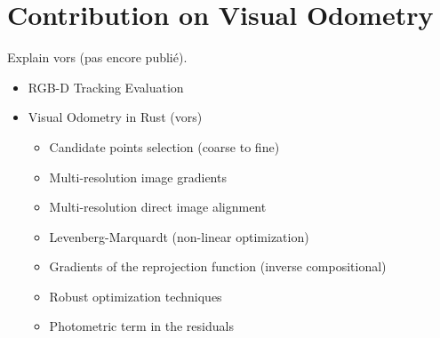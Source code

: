 \chapter{Contribution on Visual Odometry}%
\label{cha:vors}

Explain vors (pas encore publié).

\begin{itemize}
	\item RGB-D Tracking Evaluation
	\item Visual Odometry in Rust (vors)
	\begin{itemize}
		\item Candidate points selection (coarse to fine)
		\item Multi-resolution image gradients
		\item Multi-resolution direct image alignment
		\item Levenberg-Marquardt (non-linear optimization)
		\item Gradients of the reprojection function (inverse compositional)
		\item Robust optimization techniques
		\item Photometric term in the residuals
	\end{itemize}
\end{itemize}
